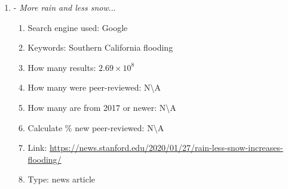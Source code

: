 \documentclass[a4paper,man,biblatex]{apa7}
\begin{document}
\begin{enumerate}
    \item \textcite{standford_2020} - \textit{More rain and less snow}...
        \begin{enumerate}
            \item Search engine used: Google
            \item Keywords: Southern California flooding 
            \item How many results: $2.69\times 10^8$ 
            \item How many were peer-reviewed: N\textbackslash A
            \item How many are from 2017 or newer:  N\textbackslash A
            \item Calculate \% new peer-reviewed: N\textbackslash A
            \item Link: \url{https://news.stanford.edu/2020/01/27/rain-less-snow-increases-flooding/}
            \item Type: news article 
        \end{enumerate}
    
    

\end{enumerate}
\end{document}
